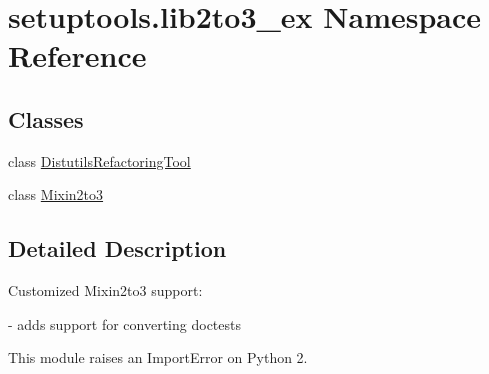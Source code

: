 \hypertarget{namespacesetuptools_1_1lib2to3__ex}{}\section{setuptools.\+lib2to3\+\_\+ex Namespace Reference}
\label{namespacesetuptools_1_1lib2to3__ex}
\subsection*{Classes}
\begin{DoxyCompactItemize}
\item 
class \hyperlink{classsetuptools_1_1lib2to3__ex_1_1DistutilsRefactoringTool}{Distutils\+Refactoring\+Tool}
\item 
class \hyperlink{classsetuptools_1_1lib2to3__ex_1_1Mixin2to3}{Mixin2to3}
\end{DoxyCompactItemize}


\subsection{Detailed Description}
\begin{DoxyVerb}Customized Mixin2to3 support:

 - adds support for converting doctests


This module raises an ImportError on Python 2.
\end{DoxyVerb}
 